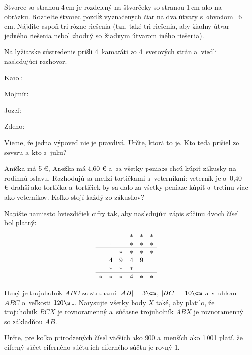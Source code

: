 {%
Štvorec so stranou 4\,cm je rozdelený na štvorčeky so stranou 1\,cm ako na obrázku.
Rozdeľte štvorec pozdĺž vyznačených čiar na dva útvary s~obvodom 16\,cm.
Nájdite aspoň tri rôzne riešenia (tzn. také tri riešenia, aby žiadny útvar jedného riešenia nebol zhodný so~žiadnym útvarom iného riešenia).
%
}

{%
Na lyžiarske sústredenie prišli 4~kamaráti zo 4~svetových strán a~viedli nasledujúci rozhovor.

Karol: 

Mojmír: 

Jozef: 

Zdeno: 

Vieme, že jedna výpoveď nie je pravdivá.
Určte, ktorá to je.
Kto teda prišiel zo severu a~kto z~juhu?
}

{%
Anička má 5 €, Anežka má 4,60 € a~za všetky peniaze chcú kúpiť zákusky na rodinnú oslavu.
Rozhodujú sa medzi tortičkami a~veterníkmi: veterník je o~0,40 € drahší ako tortička a~tortičiek by sa dalo za všetky peniaze kúpiť o~tretinu viac ako veterníkov. Koľko stojí každý zo zákuskov?
}

{%
Napíšte namiesto hviezdičiek cifry tak, aby nasledujúci zápis súčinu dvoch čísel bol platný:
$$
\begin{array}{cccccc}
 & & & * & * & * \\
 & \cdot & & * & * & * \\
\hline
 & & * & * & * & * \\
 & 4 & 9 & 4 & 9 & \\
 & * & * & * & & \\
\hline
* & * & * & 4 & * & * \\
\end{array}
$$
}

{%
Daný je trojuholník $ABC$ so stranami $|AB|=3\cm$, $|BC|=10\cm$ a~s~uhlom $ABC$ o~veľkosti $120\st$.
Narysujte všetky body $X$ také, aby platilo, že
trojuholník $BCX$ je rovnoramenný a~súčasne trojuholník $ABX$ je rovnoramenný so základňou $AB$.}

{%
Určte, pre koľko prirodzených čísel väčších ako 900 a~menších ako 1\,001 platí, že ciferný súčet ciferného súčtu ich ciferného súčtu je rovný 1.}


